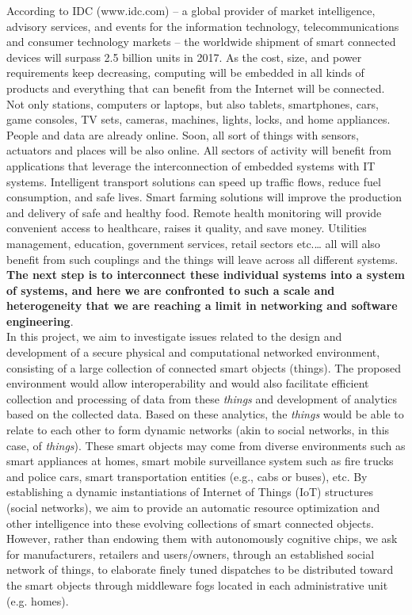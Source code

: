 
According to IDC (www.idc.com) -- a global provider of market intelligence, advisory services, and events for the information technology, telecommunications and consumer technology markets -- the worldwide shipment of smart connected devices will surpass 2.5 billion units in 2017. As the cost, size, and power requirements keep decreasing, computing will be embedded in all kinds of products and everything that can benefit from the Internet will be connected. Not only stations, computers or laptops, but also tablets, smartphones, cars, game consoles, TV sets, cameras, machines, lights, locks, and home appliances.\\

People and data are already online. Soon, all sort of things with sensors, actuators and places will be also online. All sectors of activity will benefit from applications that leverage the interconnection of embedded systems with IT systems. Intelligent transport solutions can speed up traffic flows, reduce fuel consumption, and safe lives. Smart farming solutions will improve the production and delivery of safe and healthy food. Remote health monitoring will provide convenient access to healthcare, raises it quality, and save money. Utilities management, education, government services, retail sectors etc.… all will also benefit from such couplings and the things will leave across all different systems. \textbf{The next step is to interconnect these individual systems into a system of systems, and here we are confronted to such a scale and heterogeneity that we are reaching a limit in networking and software engineering}.\\

In this project, we aim to investigate issues related to the design and development of a secure physical and computational networked environment, consisting of a large collection of connected smart objects (things). The proposed environment would allow interoperability and would also facilitate efficient collection and processing of data from these {\it things} and development of analytics based on the collected data. Based on these analytics, the {\it things} would be able to relate to each other to form dynamic networks (akin to social networks, in this case, of {\it things}). These smart objects may come from diverse environments such as smart appliances at homes, smart mobile surveillance system such as fire trucks and police cars, smart transportation entities (e.g., cabs or buses), etc. By establishing a dynamic instantiations of Internet of Things (IoT) structures (social networks), we aim to  provide an automatic resource optimization and other intelligence into these evolving collections of smart connected objects. However, rather than endowing them with autonomously cognitive chips, we ask for manufacturers, retailers and users/owners, through an established social network of things, to elaborate finely tuned dispatches to be distributed toward the smart objects through middleware fogs located in each administrative unit (e.g. homes). \\

